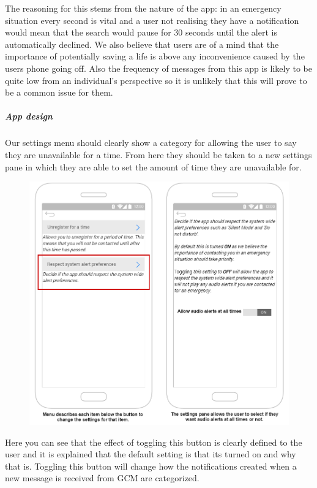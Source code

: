 \documentclass{article}
\begin{document}
The reasoning for this stems from the nature of the app: in an emergency situation every second is vital and a user not realising they have a notification would mean that the search would pause for 30 seconds until the alert is automatically declined. We also believe that users are of a mind that the importance of potentially saving a life is above any inconvenience caused by the users phone going off. Also the frequency of messages from this app is likely to be quite low from an individual's perspective so it is unlikely that this will prove to be a common issue for them.

\pagebreak
\subparagraph{App design}
Our settings menu should clearly show a category for allowing the user to say they are unavailable for a time. From here they should be taken to a new settings pane in which they are able to set the amount of time they are unavailable for.\\

	\begin{figure}[H]
		\centering
		\vspace{-20pt}
		\includegraphics[width=1\textwidth]{"Iteration5/Storyboard - Iteration 6 - 2"}
	\end{figure}

Here you can see that the effect of toggling this button is clearly defined to the user and it is explained that the default setting is that its turned on and why that is. Toggling this button will change how the notifications created when a new message is received from GCM are categorized.\\
\end{document}
